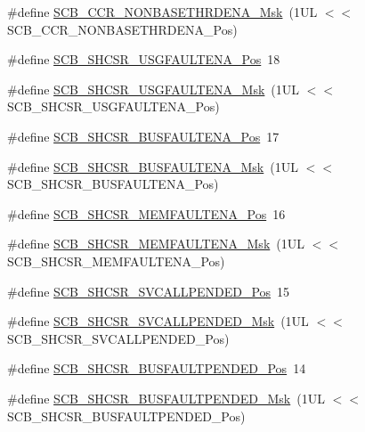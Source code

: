 \begin{DoxyCompactItemize}
\#define \hyperlink{group__CMSIS__SCB_gafe0f6be81b35d72d0736a0a1e3b4fbb3}{S\-C\-B\-\_\-\-C\-C\-R\-\_\-\-N\-O\-N\-B\-A\-S\-E\-T\-H\-R\-D\-E\-N\-A\-\_\-\-Msk}~(1\-U\-L $<$$<$ S\-C\-B\-\_\-\-C\-C\-R\-\_\-\-N\-O\-N\-B\-A\-S\-E\-T\-H\-R\-D\-E\-N\-A\-\_\-\-Pos)
\item 
\#define \hyperlink{group__CMSIS__SCB_gae71949507636fda388ec11d5c2d30b52}{S\-C\-B\-\_\-\-S\-H\-C\-S\-R\-\_\-\-U\-S\-G\-F\-A\-U\-L\-T\-E\-N\-A\-\_\-\-Pos}~18
\item 
\#define \hyperlink{group__CMSIS__SCB_ga056fb6be590857bbc029bed48b21dd79}{S\-C\-B\-\_\-\-S\-H\-C\-S\-R\-\_\-\-U\-S\-G\-F\-A\-U\-L\-T\-E\-N\-A\-\_\-\-Msk}~(1\-U\-L $<$$<$ S\-C\-B\-\_\-\-S\-H\-C\-S\-R\-\_\-\-U\-S\-G\-F\-A\-U\-L\-T\-E\-N\-A\-\_\-\-Pos)
\item 
\#define \hyperlink{group__CMSIS__SCB_ga3d32edbe4a5c0335f808cfc19ec7e844}{S\-C\-B\-\_\-\-S\-H\-C\-S\-R\-\_\-\-B\-U\-S\-F\-A\-U\-L\-T\-E\-N\-A\-\_\-\-Pos}~17
\item 
\#define \hyperlink{group__CMSIS__SCB_ga43e8cbe619c9980e0d1aacc85d9b9e47}{S\-C\-B\-\_\-\-S\-H\-C\-S\-R\-\_\-\-B\-U\-S\-F\-A\-U\-L\-T\-E\-N\-A\-\_\-\-Msk}~(1\-U\-L $<$$<$ S\-C\-B\-\_\-\-S\-H\-C\-S\-R\-\_\-\-B\-U\-S\-F\-A\-U\-L\-T\-E\-N\-A\-\_\-\-Pos)
\item 
\#define \hyperlink{group__CMSIS__SCB_ga685b4564a8760b4506f14ec4307b7251}{S\-C\-B\-\_\-\-S\-H\-C\-S\-R\-\_\-\-M\-E\-M\-F\-A\-U\-L\-T\-E\-N\-A\-\_\-\-Pos}~16
\item 
\#define \hyperlink{group__CMSIS__SCB_gaf084424fa1f69bea36a1c44899d83d17}{S\-C\-B\-\_\-\-S\-H\-C\-S\-R\-\_\-\-M\-E\-M\-F\-A\-U\-L\-T\-E\-N\-A\-\_\-\-Msk}~(1\-U\-L $<$$<$ S\-C\-B\-\_\-\-S\-H\-C\-S\-R\-\_\-\-M\-E\-M\-F\-A\-U\-L\-T\-E\-N\-A\-\_\-\-Pos)
\item 
\#define \hyperlink{group__CMSIS__SCB_ga2f93ec9b243f94cdd3e94b8f0bf43641}{S\-C\-B\-\_\-\-S\-H\-C\-S\-R\-\_\-\-S\-V\-C\-A\-L\-L\-P\-E\-N\-D\-E\-D\-\_\-\-Pos}~15
\item 
\#define \hyperlink{group__CMSIS__SCB_ga6095a7acfbad66f52822b1392be88652}{S\-C\-B\-\_\-\-S\-H\-C\-S\-R\-\_\-\-S\-V\-C\-A\-L\-L\-P\-E\-N\-D\-E\-D\-\_\-\-Msk}~(1\-U\-L $<$$<$ S\-C\-B\-\_\-\-S\-H\-C\-S\-R\-\_\-\-S\-V\-C\-A\-L\-L\-P\-E\-N\-D\-E\-D\-\_\-\-Pos)
\item 
\#define \hyperlink{group__CMSIS__SCB_gaa22551e24a72b65f1e817f7ab462203b}{S\-C\-B\-\_\-\-S\-H\-C\-S\-R\-\_\-\-B\-U\-S\-F\-A\-U\-L\-T\-P\-E\-N\-D\-E\-D\-\_\-\-Pos}~14
\item 
\#define \hyperlink{group__CMSIS__SCB_ga677c23749c4d348f30fb471d1223e783}{S\-C\-B\-\_\-\-S\-H\-C\-S\-R\-\_\-\-B\-U\-S\-F\-A\-U\-L\-T\-P\-E\-N\-D\-E\-D\-\_\-\-Msk}~(1\-U\-L $<$$<$ S\-C\-B\-\_\-\-S\-H\-C\-S\-R\-\_\-\-B\-U\-S\-F\-A\-U\-L\-T\-P\-E\-N\-D\-E\-D\-\_\-\-Pos)

\end{DoxyCompactItemize}
